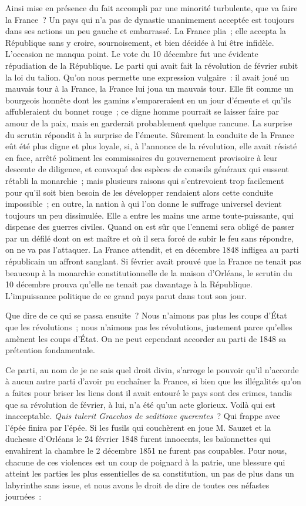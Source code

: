 \documentclass[french,twoside]{book} %
\begin{document}
Ainsi mise en présence du fait accompli par une minorité turbulente, que va faire la France ? Un pays qui n’a pas de dynastie unanimement acceptée est toujours dans ses actions un peu gauche et embarrassé. La France plia ; elle accepta la République sans y croire, sournoisement, et bien décidée à lui être infidèle. L’occasion ne manqua point. Le vote du 10 décembre fut une évidente répudiation de la République. Le parti qui avait fait la révolution de février subit la loi du talion. Qu’on nous permette une expression vulgaire : il avait joué un mauvais tour à la France, la France lui joua un mauvais tour. Elle fit comme un bourgeois honnête dont les gamins s’empareraient en un jour d’émeute et qu’ils affubleraient du bonnet rouge ; ce digne homme pourrait se laisser faire par amour de la paix, mais en garderait probablement quelque rancune. La surprise du scrutin répondit à la surprise de l’émeute. Sûrement la conduite de la France eût été plus digne et plus loyale, si, à l’annonce de la révolution, elle avait résisté en face, arrêté poliment les commissaires du gouvernement provisoire à leur descente de diligence, et convoqué des espèces de conseils généraux qui eussent rétabli la monarchie ; mais plusieurs raisons qui s’entrevoient trop facilement pour qu’il soit bien besoin de les développer rendaient alors cette conduite impossible ; en outre, la nation à qui l’on donne le suffrage universel devient toujours un peu dissimulée. Elle a entre les mains une arme toute-puissante, qui dispense des guerres civiles. Quand on est sûr que l’ennemi sera obligé de passer par un défilé dont on est maître et où il sera forcé de subir le feu sans répondre, on ne va pas l’attaquer. La France attendit, et en décembre 1848 infligea au parti républicain un affront sanglant. Si février avait prouvé que la France ne tenait pas beaucoup à la monarchie constitutionnelle de la maison d’Orléans, le scrutin du 10 décembre prouva qu’elle ne tenait pas davantage à la République. L’impuissance politique de ce grand pays parut dans tout son jour.\par
Que dire de ce qui se passa ensuite ? Nous n’aimons pas plus les coups d’État que les révolutions ; nous n’aimons pas les révolutions, justement parce qu’elles amènent les coups d’État. On ne peut cependant accorder au parti de 1848 sa prétention fondamentale.\par
Ce parti, au nom de je ne sais quel droit divin, s’arroge le pouvoir qu’il n’accorde à aucun autre parti d’avoir pu enchaîner la France, si bien que les illégalités qu’on a faites pour briser les liens dont il avait entouré le pays sont des crimes, tandis que sa révolution de février, à lui, n’a été qu’un acte glorieux. Voilà qui est inacceptable. {\itshape Quis tulerit Gracchos de seditione querentes} ? Qui frappe avec l’épée finira par l’épée. Si les fusils qui couchèrent en joue M. Sauzet et la duchesse d’Orléans le 24 février 1848 furent innocents, les baïonnettes qui envahirent la chambre le 2 décembre 1851 ne furent pas coupables. Pour nous, chacune de ces violences est un coup de poignard à la patrie, une blessure qui atteint les parties les plus essentielles de sa constitution, un pas de plus dans un labyrinthe sans issue, et nous avons le droit de dire de toutes ces néfastes journées :\par
\end{document}
